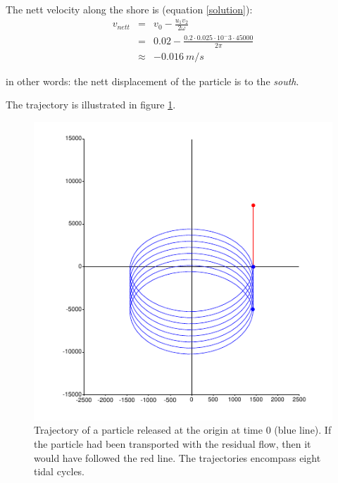 \documentclass[onecolumn]{article}
\begin{document}
The nett velocity along the shore is (equation \ref{solution}):
\begin{eqnarray}
\nonumber    v_{nett} &=& v_0 - \frac{u_1 v_2}{2 \omega} \\
\nonumber             &=& 0.02 - \frac{0.2 \cdot 0.025 \cdot 10^-3 \cdot 45000}{2 \pi} \\
\nonumber             &\approx& - 0.016~ m/s
\end{eqnarray}

\noindent in other words: the nett displacement of the particle is to the \emph{south}.

The trajectory is illustrated in figure \ref{trajectory}.

\begin{figure}
\caption{Trajectory of a particle released at the origin at time 0 (blue line). If the particle had been transported
with the residual flow, then it would have followed the red line. The trajectories encompass eight tidal cycles.}
\label{trajectory}
\center
\includegraphics{trajectory.pdf}
\end{figure}
\end{document}
